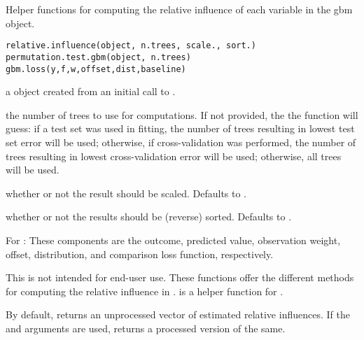 \documentclass{article}
\begin{document}
\begin{Description}\relax
Helper functions for computing the relative influence of each variable in the gbm object.
\end{Description}
\begin{Usage}
\begin{verbatim}
relative.influence(object, n.trees, scale., sort.)
permutation.test.gbm(object, n.trees)
gbm.loss(y,f,w,offset,dist,baseline)
\end{verbatim}
\end{Usage}
\begin{Arguments}
\begin{ldescription}
\item[\code{object}] a  object created from an initial call to .
\item[\code{n.trees}] the number of trees to use for computations. If not provided, the
the function will guess: if a test set was used in fitting, the number of
trees resulting in lowest test set error will be used; otherwise, if
cross-validation was performed, the number of trees resulting in lowest
cross-validation error will be used; otherwise, all trees will be used.
\item[\code{scale.}] whether or not the result should be scaled. Defaults to .
\item[\code{sort.}] whether or not the results should be (reverse) sorted.
Defaults to .
\item[\code{y,f,w,offset,dist,baseline}] For : These components are the
outcome, predicted value, observation weight, offset, distribution, and comparison
loss function, respectively.
\end{ldescription}
\end{Arguments}
\begin{Details}\relax
This is not intended for end-user use. These functions offer the different
methods for computing the relative influence in .
 is a helper function for .
\end{Details}
\begin{Value}
By default, returns an unprocessed vector of estimated relative influences.
If the  and  arguments are used, returns a processed
version of the same.
\end{Value}
\end{document}
